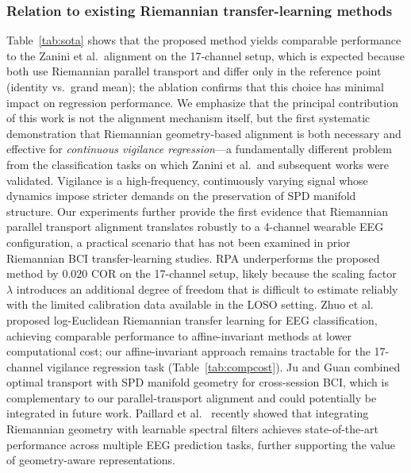 \documentclass[journal,twoside,web]{ieeecolor2}
\begin{document}
\subsubsection{Relation to existing Riemannian transfer-learning methods}
Table~\ref{tab:sota} shows that the proposed method yields comparable
performance to the Zanini et al.\ alignment \cite{zanini2018} on the
17-channel setup, which is expected because both use Riemannian
parallel transport and differ only in the reference point (identity
vs.\ grand mean); the ablation confirms that this choice has minimal
impact on regression performance.
We emphasize that the principal contribution of this work is not the
alignment mechanism itself, but the first systematic demonstration that
Riemannian geometry-based alignment is both necessary and effective for
\emph{continuous vigilance regression}---a fundamentally different
problem from the classification tasks on which Zanini et al.\ and
subsequent works were validated. Vigilance is a high-frequency,
continuously varying signal whose dynamics impose stricter demands on
the preservation of SPD manifold structure. Our experiments further
provide the first evidence that Riemannian parallel transport alignment
translates robustly to a 4-channel wearable EEG configuration, a
practical scenario that has not been examined in prior Riemannian BCI
transfer-learning studies. RPA
\cite{Rodrigues2019} underperforms the proposed method by $0.020$
COR on the 17-channel setup, likely because the scaling factor
$\lambda$ introduces an additional degree of freedom that is
difficult to estimate reliably with the limited calibration data
available in the LOSO setting. Zhuo et al.\ \cite{zhuo2024} proposed
log-Euclidean Riemannian transfer learning for EEG classification,
achieving comparable performance to affine-invariant methods at lower
computational cost; our affine-invariant approach remains tractable
for the 17-channel vigilance regression task (Table~\ref{tab:compcost}).
Ju and Guan \cite{ju2025} combined optimal transport with SPD manifold
geometry for cross-session BCI, which is complementary to our
parallel-transport alignment and could potentially be integrated in
future work. Paillard et al.\ \cite{paillard2025} recently showed that
integrating Riemannian geometry with learnable spectral filters
achieves state-of-the-art performance across multiple EEG prediction
tasks, further supporting the value of geometry-aware representations.
\end{document}

